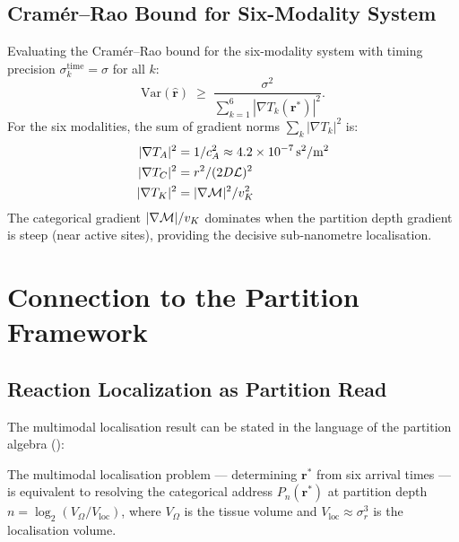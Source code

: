 \subsection{Cramér--Rao Bound for Six-Modality System}

Evaluating the Cramér--Rao bound for the six-modality system with timing
precision $\sigma_k^\mathrm{time} = \sigma$ for all $k$:
\begin{equation}
    \mathrm{Var}(\hat{\mathbf{r}})
    \;\ge\;
    \frac{\sigma^2}{\sum_{k=1}^6 |\nabla T_k(\mathbf{r}^*)|^2}.
    \label{eq:cramer-rao}
\end{equation}
For the six modalities, the sum of gradient norms $\sum_k |\nabla T_k|^2$
is:
\begin{align*}
    |\nabla T_A|^2 &= 1/c_A^2 \approx 4.2 \times 10^{-7}\,\text{s}^2/\text{m}^2 \\
    |\nabla T_C|^2 &= r^2/(2D\mathcal{L})^2 \\
    |\nabla T_K|^2 &= |\nabla\mathcal{M}|^2/v_K^2
\end{align*}
The categorical gradient $|\nabla\mathcal{M}|/v_K$ dominates when the partition
depth gradient is steep (near active sites), providing the decisive
sub-nanometre localisation.

\section{Connection to the Partition Framework}
\label{sec:partition-connection}

\subsection{Reaction Localization as Partition Read}

The multimodal localisation result can be stated in the language of the
partition algebra ():

\begin{theorem}
\label{thm:loc-as-cat}
The multimodal localisation problem --- determining $\mathbf{r}^*$ from
six arrival times --- is equivalent to resolving the categorical address
$P_n(\mathbf{r}^*)$ at partition depth $n = \log_2(V_\Omega/V_\mathrm{loc})$,
where $V_\Omega$ is the tissue volume and $V_\mathrm{loc} \approx \sigma_r^3$
is the localisation volume.
\end{theorem}

